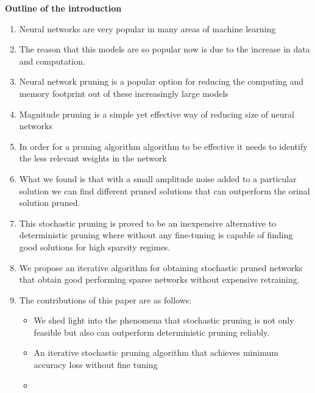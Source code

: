 \vspace{3cm}
\textbf{Outline of the  introduction}

\begin{enumerate}
    \item Neural networks are very popular in many areas of machine learning
    \item The reason that this models are so popular now is due to the increase
        in data and computation.
    \item Neural network pruning is a popular option for reducing the computing
        and memory footprint out of these increasingly large models
    \item Magnitude pruning is a simple yet effective way of reducing size of
        neural networks
    \item In order for a pruning algorithm algorithm to be effective it needs
        to identify the less relevant weights in the network
    \item What we found is that with a small amplitude noise added to a
        particular solution we can find different pruned solutions that can
        outperform the orinal solution pruned.
    \item This stochastic pruning is proved to be an inexpensive alternative
        to deterministic pruning where without any fine-tuning is capable of
        finding good solutions for high sparsity regimes.
    \item We propose an iterative algorithm for obtaining stochastic pruned
        networks that obtain good performing sparse networks without expensive
        retraining.
        

    \item The contributions of this paper are as follows:
     \begin{itemize}
         \item We shed light into the phenomena that stochastic pruning is not
             only feasible but also can outperform deterministic pruning
             reliably.
        \item An iterative stochastic pruning algorithm that achieves minimum
            accuracy loss without fine tuning
        \item {}

     \end{itemize}

\end{enumerate}

